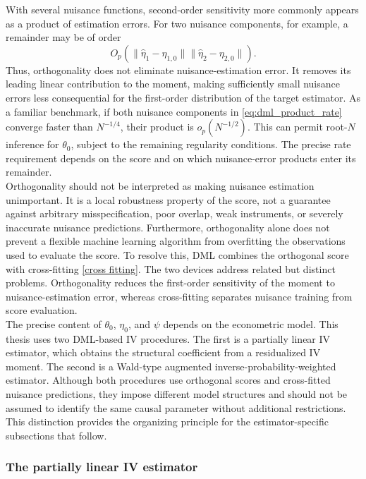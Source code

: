 \documentclass[12pt, a4paper, oneside]{article}
\theoremstyle{plain}
\theoremstyle{definition}
\begin{document}
With several nuisance functions, second-order sensitivity more commonly appears
as a product of estimation errors. For two nuisance components, for example, a
remainder may be of order
\begin{equation}
    O_p\!\left(
      \|\hat\eta_1-\eta_{1,0}\|
      \|\hat\eta_2-\eta_{2,0}\|
    \right).
    \label{eq:dml_product_rate}
\end{equation}
Thus, orthogonality does not eliminate nuisance-estimation error. It removes its
leading linear contribution to the moment, making sufficiently small nuisance
errors less consequential for the first-order distribution of the target
estimator. As a familiar benchmark, if both nuisance components in
\eqref{eq:dml_product_rate} converge faster than $N^{-1/4}$, their product is
$o_p(N^{-1/2})$. This can permit root-$N$ inference for $\theta_0$, subject to
the remaining regularity conditions. The precise rate requirement depends on
the score and on which nuisance-error products enter its remainder.\\
Orthogonality should not be interpreted as making nuisance estimation unimportant. It is a local robustness property of the score, not a guarantee against arbitrary misspecification, poor overlap, weak instruments, or severely inaccurate nuisance predictions. Furthermore, orthogonality alone does not prevent a flexible machine learning algorithm from overfitting the observations used to evaluate the score.
To resolve this, DML combines the orthogonal score with cross-fitting \ref{cross fitting}. 
The two
devices address related but distinct problems.
Orthogonality reduces the
first-order sensitivity of the moment to nuisance-estimation error, whereas
cross-fitting separates nuisance training from score evaluation. \\
The precise content of $\theta_0$, $\eta_0$, and $\psi$ depends on the
econometric model. This thesis uses two DML-based IV procedures.
The first is a
partially linear IV estimator, which obtains the structural coefficient from a
residualized IV moment. The second is a Wald-type augmented
inverse-probability-weighted estimator. Although both procedures use
orthogonal scores and cross-fitted nuisance predictions, they impose different
model structures and should not be assumed to identify the same causal
parameter without additional restrictions. This distinction provides the
organizing principle for the estimator-specific subsections that follow.


\subsubsection{The partially linear IV estimator}
\end{document}
